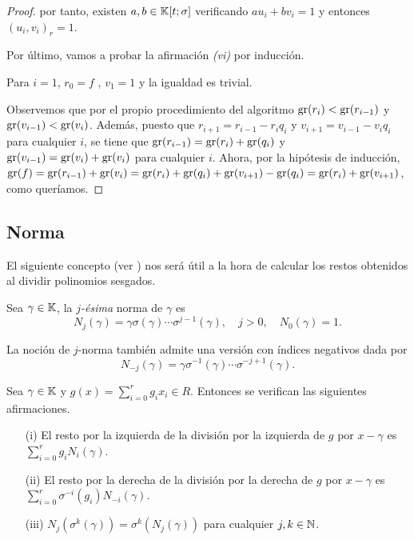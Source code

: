 \begin{lema}
\begin{proof}
    por tanto, existen $a,b \in \mathbb{K}[t;\sigma]$ verificando $au_i + bv_i = 1$ y entonces $(u_i,v_i)_r = 1$.

Por último, vamos a probar la afirmación \textit{(vi)} por inducción.

Para $i = 1$, $r_0 = f$ , $v_1 = 1$ y la igualdad es trivial.

Observemos que por el propio procedimiento del algoritmo $\operatorname{gr}(r_i) < \operatorname{gr}(r_{i-1})$ y $\operatorname{gr}(v_{i-1}) < \operatorname{gr}(v_i)$. Además, puesto que $r_{i+1} = r_{i-1} - r_iq_i$ y $v_{i+1} = v_{i-1} - v_iq_i$ para cualquier $i$, se tiene que $\operatorname{gr}(r_{i-1}) = \operatorname{gr}(r_i) + \operatorname{gr}(q_i)$ y $\operatorname{gr}(v_{i-1}) = \operatorname{gr}(v_i) + \operatorname{gr}(v_i)$ para cualquier $i$. Ahora, por la hipótesis de inducción, $\operatorname{gr}(f) = \operatorname{gr}(r_{i-1}) + \operatorname{gr}(v_i) = \operatorname{gr}(r_i) + \operatorname{gr}(q_i) + \operatorname{gr}(v_{i+1}) - \operatorname{gr}(q_i) = \operatorname{gr}(r_i) + \operatorname{gr}(v_{i+1})$, como queríamos. 

\end{proof}



\end{lema}

\subsection{Norma}

El siguiente concepto (ver \cite{Norm}) nos será útil a la hora de calcular los restos obtenidos al dividir polinomios sesgados.

\begin{definicion}
Sea $\gamma \in \mathbb{K}$, la \emph{$j$-ésima} norma de $\gamma$ es 
$$N_j(\gamma) = \gamma \sigma(\gamma) \cdots \sigma^{j-1}(\gamma), \quad j > 0, \quad N_0(\gamma) = 1.$$
\end{definicion}

La noción de $j$-norma también admite una versión con índices negativos dada por $$N_{-j}(\gamma) = \gamma \sigma^{-1}(\gamma) \cdots \sigma^{-j+1}(\gamma).$$

\begin{proposicion}\label{prop:norma}
Sea $\gamma \in \mathbb{K}$ y $g(x) = \sum_{i=0}^{r}g_ix_i \in R$. Entonces se verifican las siguientes afirmaciones.
\begin{itemize}
    \item[(i)] El resto por la izquierda de la división por la izquierda de $g$ por $x - \gamma$ es $\sum_{i=0}^{r}g_iN_i(\gamma)$.
    \item[(ii)] El resto por la derecha de la división por la derecha de $g$ por $x - \gamma$ es $\sum_{i=0}^{r}\sigma^{-i}(g_i)N_{-i}(\gamma)$.
    \item[(iii)] $N_j(\sigma^k(\gamma)) = \sigma^k(N_j(\gamma))$ para cualquier $j,k \in \mathbb{N}$. 
\end{itemize}
\end{proposicion}

